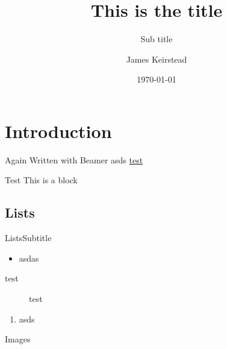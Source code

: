 
\title{This is the title}
\subtitle{Sub title}
\date{\today}
\author{James Keirstead}

\usepackage{lipsum}



\begin{frame}
\maketitle
\end{frame}

\section{Introduction}

\lipsum[1]

\begin{frame}{Again}
Written with Beamer \citep{Tantau_2004} \pause
asds \url{test}

\begin{block}{Test}
This is a block
\end{block}
\end{frame}

\lipsum[2]

\subsection{Lists}

\begin{frame}{Lists}{Subtitle}
\begin{itemize}
\item asdas
\end{itemize}

\begin{description}
\item [test] test
\end{description}

\begin{enumerate}
\item asds
\end{enumerate}
\end{frame}


\lipsum[3]

\begin{frame}{Images}


\end{frame}

